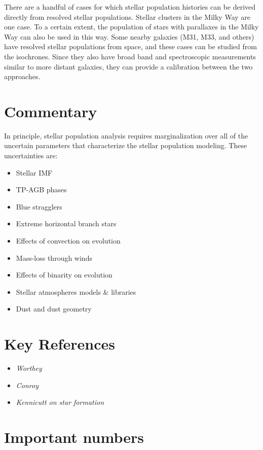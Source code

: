 There are a handful of cases for which stellar population histories
can be derived directly from resolved stellar populations. Stellar
clusters in the Milky Way are one case. To a certain extent, the
population of stars with parallaxes in the Milky Way can also be used
in this way. Some nearby galaxies (M31, M33, and others) have resolved
stellar populations from space, and these cases can be studied from
the isochrones. Since they also have broad band and spectroscopic
measurements similar to more distant galaxies, they can provide a
calibration between the two approaches.

\section{Commentary}

In principle, stellar population analysis requires marginalization
over all of the uncertain parameters that characterize the stellar
population modeling. These uncertainties are:
\begin{itemize}
\item Stellar IMF
\item TP-AGB phases
\item Blue stragglers
\item Extreme horizontal branch stars
\item Effects of convection on evolution
\item Mass-loss through winds
\item Effects of binarity on evolution
\item Stellar atmospheres models \& libraries
\item Dust and dust geometry
\end{itemize}

\section{Key References}

\begin{itemize}
  \item
    {\it Worthey}
  \item
    {\it Conroy}
  \item
    {\it Kennicutt on star formation}
\end{itemize}

\citet{gunn06a}

\section{Important numbers}

